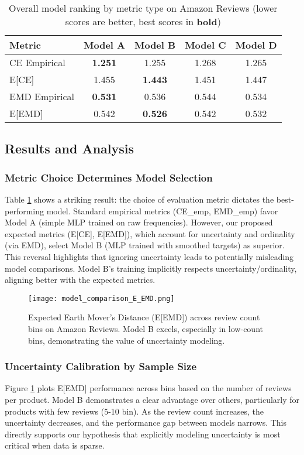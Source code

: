 \documentclass[journal]{IEEEtran}
\begin{document}
\begin{table}[t]
\centering
\small
\caption{Overall model ranking by metric type on Amazon Reviews (lower scores are better, best scores in \textbf{bold})}
\label{tab:model_ranking}
\begin{tabular}{|l|cccc|}
\hline
\textbf{Metric} & \textbf{Model A} & \textbf{Model B} & \textbf{Model C} & \textbf{Model D} \\
\hline
CE Empirical & \textbf{1.251} & 1.255 & 1.268 & 1.265 \\
E[CE] & 1.455 & \textbf{1.443} & 1.451 & 1.447 \\
EMD Empirical & \textbf{0.531} & 0.536 & 0.544 & 0.534 \\
E[EMD] & 0.542 & \textbf{0.526} & 0.542 & 0.532 \\
\hline
\end{tabular}
\end{table}

\subsection{Results and Analysis}

\subsubsection{Metric Choice Determines Model Selection}
Table \ref{tab:model_ranking} shows a striking result: the choice of evaluation metric dictates the best-performing model. Standard empirical metrics (CE\_emp, EMD\_emp) favor Model A (simple MLP trained on raw frequencies). However, our proposed expected metrics (E[CE], E[EMD]), which account for uncertainty and ordinality (via EMD), select Model B (MLP trained with smoothed targets) as superior. This reversal highlights that ignoring uncertainty leads to potentially misleading model comparisons. Model B's training implicitly respects uncertainty/ordinality, aligning better with the expected metrics.

\begin{figure}[t]
    \centering
    \texttt{[image: model\_comparison\_E\_EMD.png]}
    \caption{Expected Earth Mover's Distance (E[EMD]) across review count bins on Amazon Reviews. Model B excels, especially in low-count bins, demonstrating the value of uncertainty modeling.}
    \label{fig:emd_bin_comparison}
\end{figure}

\subsubsection{Uncertainty Calibration by Sample Size}
Figure \ref{fig:emd_bin_comparison} plots E[EMD] performance across bins based on the number of reviews per product. Model B demonstrates a clear advantage over others, particularly for products with few reviews (5-10 bin). As the review count increases, the uncertainty decreases, and the performance gap between models narrows. This directly supports our hypothesis that explicitly modeling uncertainty is most critical when data is sparse.
\end{document}

